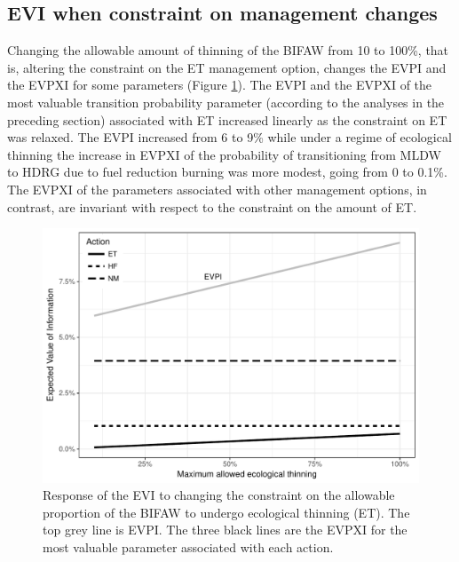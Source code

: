 \documentclass[draft]{article}
\theoremstyle{definition}
\theoremstyle{definition}
\theoremstyle{definition}
\theoremstyle{remark}
\begin{document}
\subsection*{EVI when constraint on management
changes}\label{evi-when-constraint-on-management-changes}

Changing the allowable amount of thinning of the BIFAW from 10 to 100\%,
that is, altering the constraint on the ET management option, changes
the EVPI and the EVPXI for some parameters (Figure \ref{fig:Figure4}).
The EVPI and the EVPXI of the most valuable transition probability
parameter (according to the analyses in the preceding section)
associated with ET increased linearly as the constraint on ET was
relaxed. The EVPI increased from 6 to 9\% while under a regime of
ecological thinning the increase in EVPXI of the probability of
transitioning from MLDW to HDRG due to fuel reduction burning was more
modest, going from 0 to 0.1\%. The EVPXI of the parameters associated
with other management options, in contrast, are invariant with respect
to the constraint on the amount of ET.






\begin{figure}[htbp]
\centering
\includegraphics{Figure4-1.pdf}
\caption{\label{fig:Figure4}Response of the EVI to changing the constraint on the
allowable proportion of the BIFAW to undergo ecological thinning (ET).
The top grey line is EVPI. The three black lines are the EVPXI for the
most valuable parameter associated with each action.}
\end{figure}
\end{document}
